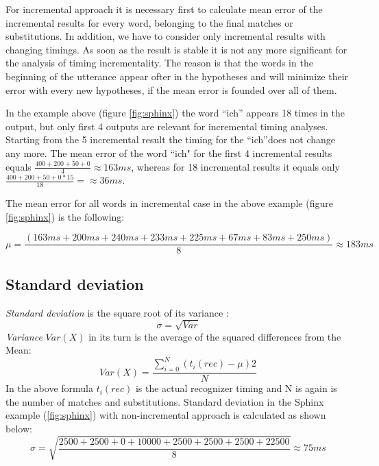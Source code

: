For incremental approach it is necessary first to calculate mean error of the
incremental results for every word, belonging to the final matches or
substitutions. In addition, we have to consider only incremental results with
changing timings. As soon as the result is stable it is not any more significant
for the analysis of timing incrementality. The reason is that the words in the
beginning of the utterance appear ofter in the hypotheses and will minimize their error with
every new hypotheses, if the mean error is founded over all of them.  

In the example above (figure \ref{fig:sphinx}) the word ``ich''  appears 18
times in the output, but only first 4 outputs are relevant for incremental timing
analyses.  Starting from the 5 incremental result the timing for the ``ich''does
not change any more.  The mean error of the word ``ich" for the first 4
incremental results equals $\frac {400+200+50+0}{4}\approx 163 ms$, whereas for 18 incremental results 
it equals only $\frac {400+200+50+0*15}{18}=\approx 36 ms$. 

The mean error for all words in incremental case in the above example (figure
\ref{fig:sphinx}) is the following:

\begin{equation} \mu=\frac{(163 ms +200ms +240 ms+233 ms+225ms+67
ms+83 ms+250 ms)}{8} \approx 183 ms
\label{eq:mean_comp_inc}
\end{equation}





\subsection {Standard deviation}
\textit {Standard deviation} is the square root of its variance
:\begin{equation} \sigma=\sqrt {Var}
\end{equation}
\textit {Variance} $Var(X)$ in its turn is the average of the squared
differences from the Mean:
\begin{equation} Var(X)=\frac{\sum_{i=0}^N (t_i(rec)-\mu)2}{N}
\end{equation}
In the above formula $t_i(rec)$ is the actual recognizer timing and N is again
is the number of matches and substitutions.  Standard deviation in the Sphinx
example (\ref{fig:sphinx}) with non-incremental approach is calculated as shown
below:
\begin{equation} \sigma=\sqrt {\frac
{2500+2500+0+10000+2500+2500+2500+22500}{8}}\approx 75 ms
\end{equation}

